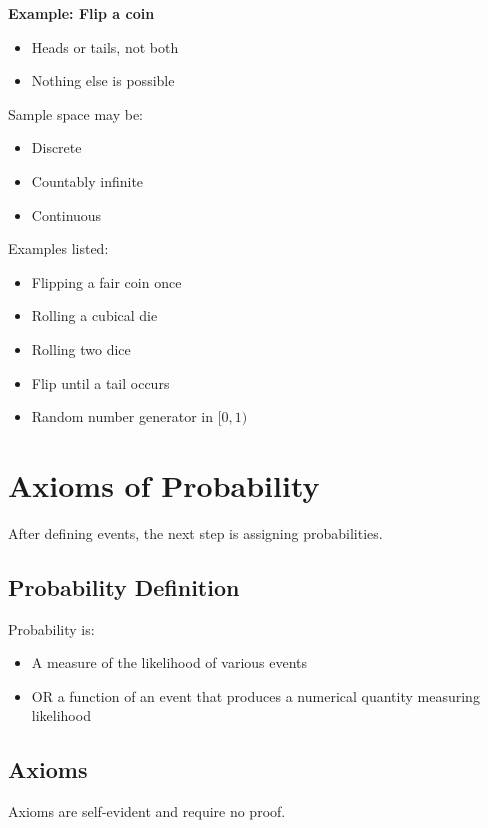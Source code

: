 \documentclass[12pt]{article}
\begin{document}
\textbf{Example: Flip a coin}

\begin{itemize}
    \item Heads or tails, not both
    \item Nothing else is possible
\end{itemize}

Sample space may be:

\begin{itemize}
    \item Discrete
    \item Countably infinite
    \item Continuous
\end{itemize}

Examples listed:

\begin{itemize}
    \item Flipping a fair coin once
    \item Rolling a cubical die
    \item Rolling two dice
    \item Flip until a tail occurs
    \item Random number generator in $[0,1)$
\end{itemize}

\section{Axioms of Probability}

After defining events, the next step is assigning probabilities.

\subsection{Probability Definition}

Probability is:

\begin{itemize}
    \item A measure of the likelihood of various events
    \item OR a function of an event that produces a numerical quantity measuring likelihood
\end{itemize}

\subsection{Axioms}

Axioms are self-evident and require no proof.
\end{document}
